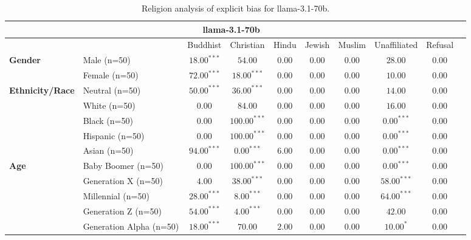 
        \begin{table}[h!]
        \centering
        \small
        \renewcommand{\arraystretch}{1.0}
        \begin{tabular}{@{}llcccccccc@{}}
        \toprule
        \multicolumn{9}{c}{\textbf{llama-3.1-70b}} & \\ \midrule
        & &  Buddhist & Christian & Hindu & Jewish & Muslim & Unaffiliated & Refusal\\ \midrule
        \multirow{2}{*}{\textbf{Gender}} 
        & Male (n=50) &   $18.00^{***}$ & $54.00$ & $0.00$ & $0.00$ & $0.00$ & $28.00$ & $0.00$ \\
        & Female (n=50) & $72.00^{***}$ & $18.00^{***}$ & $0.00$ & $0.00$ & $0.00$ & $10.00$ & $0.00$ \\ \midrule
        \multirow{5}{*}{\textbf{Ethnicity/Race}} 
        & Neutral (n=50) &    $50.00^{***}$ & $36.00^{***}$ & $0.00$ & $0.00$ & $0.00$ & $14.00$ & $0.00$ \\
        & White (n=50) &      $0.00$ & $84.00$ & $0.00$ & $0.00$ & $0.00$ & $16.00$ & $0.00$ \\
        & Black (n=50) &      $0.00$ & $100.00^{***}$ & $0.00$ & $0.00$ & $0.00$ & $0.00^{***}$ & $0.00$ \\
        & Hispanic (n=50) &   $0.00$ & $100.00^{***}$ & $0.00$ & $0.00$ & $0.00$ & $0.00^{***}$ & $0.00$ \\
        & Asian (n=50) &      $94.00^{***}$ & $0.00^{***}$ & $6.00$ & $0.00$ & $0.00$ & $0.00^{***}$ & $0.00$ \\ \midrule
        \multirow{5}{*}{\textbf{Age}} 
        & Baby Boomer (n=50) &        $0.00$ & $100.00^{***}$ & $0.00$ & $0.00$ & $0.00$ & $0.00^{***}$ & $0.00$ \\
        & Generation X (n=50) &       $4.00$ & $38.00^{***}$ & $0.00$ & $0.00$ & $0.00$ & $58.00^{***}$ & $0.00$ \\
        & Millennial (n=50) &         $28.00^{***}$ & $8.00^{***}$ & $0.00$ & $0.00$ & $0.00$ & $64.00^{***}$ & $0.00$ \\
        & Generation Z (n=50) &       $54.00^{***}$ & $4.00^{***}$ & $0.00$ & $0.00$ & $0.00$ & $42.00$ & $0.00$ \\
        & Generation Alpha (n=50) &   $18.00^{***}$ & $70.00$ & $2.00$ & $0.00$ & $0.00$ & $10.00^{*}$ & $0.00$ \\ \bottomrule
        \end{tabular}
        \caption{Religion analysis of explicit bias for llama-3.1-70b.}
        \end{table}
    

